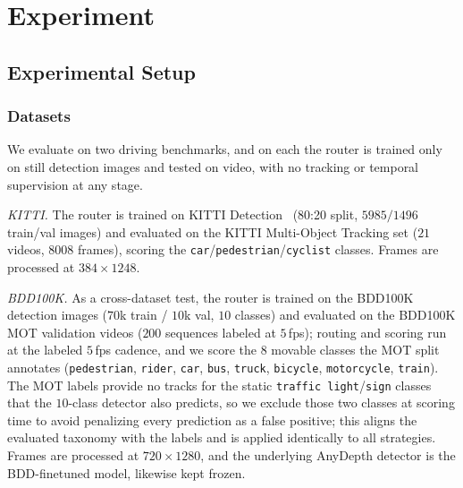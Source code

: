 \section{Experiment}
\label{sec:exp}

\subsection{Experimental Setup}

\subsubsection{Datasets}
\label{sec:setup_data}
We evaluate on two driving benchmarks, and on each the router is trained only on
still detection images and tested on video, with no tracking or temporal
supervision at any stage.

\noindent\emph{KITTI.} The router is trained on KITTI Detection~\cite{geiger2012kitti}
(80:20 split, $5985/1496$ train/val images) and evaluated on the KITTI
Multi-Object Tracking set ($21$ videos, $8008$ frames), scoring the
\texttt{car}/\texttt{pedestrian}/\texttt{cyclist} classes. Frames are processed at
$384\times1248$.

\noindent\emph{BDD100K.} As a cross-dataset test, the router is trained on the
BDD100K~\cite{yu2020bdd} detection images ($70$k train / $10$k val, $10$ classes)
and evaluated on the BDD100K MOT validation videos
($200$ sequences labeled at $5$\,fps); routing and scoring run at the labeled $5$\,fps
cadence, and we score the $8$ movable classes the MOT split annotates
(\texttt{pedestrian}, \texttt{rider}, \texttt{car}, \texttt{bus}, \texttt{truck},
\texttt{bicycle}, \texttt{motorcycle}, \texttt{train}). The MOT labels provide no
tracks for the static \texttt{traffic\,light}/\texttt{sign} classes that the
$10$-class detector also predicts, so we exclude those two classes at scoring time
to avoid penalizing every prediction as a false positive; this aligns the evaluated
taxonomy with the labels and is applied identically to all strategies. Frames are
processed at $720\times1280$, and the underlying AnyDepth detector is the
BDD-finetuned model, likewise kept frozen.


